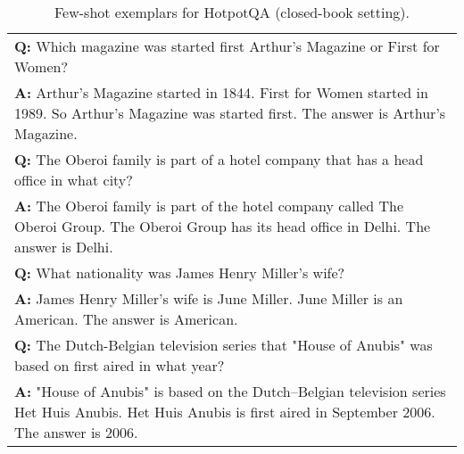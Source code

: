 \begin{table}[h]
    \caption{
    Few-shot exemplars for HotpotQA (closed-book setting).
    }
    \centering
    \small
    \begin{tabular}{p{14cm}}
        \toprule
        \textbf{Q:} Which magazine was started first Arthur's Magazine or First for Women?\\
        \vspace{-1mm}
        \textbf{A:} Arthur's Magazine started in 1844. First for Women started in 1989. So Arthur's Magazine was started first. The answer is Arthur's Magazine.\\
        \vspace{0mm}
        \textbf{Q:} The Oberoi family is part of a hotel company that has a head office in what city?\\
        \vspace{-1mm}
        \textbf{A:} The Oberoi family is part of the hotel company called The Oberoi Group. The Oberoi Group has its head office in Delhi. The answer is Delhi. \\
        \vspace{0mm}
        \textbf{Q:} What nationality was James Henry Miller's wife?\\
        \vspace{-1mm}
        \textbf{A:} James Henry Miller's wife is June Miller. June Miller is an American. The answer is American.\\
        \vspace{0mm}
        \textbf{Q:} The Dutch-Belgian television series that "House of Anubis" was based on first aired in what year?\\
        \vspace{-1mm}
        \textbf{A:} "House of Anubis" is based on the Dutch–Belgian television series Het Huis Anubis. Het Huis Anubis is first aired in September 2006. The answer is 2006.\\
        \bottomrule
    \end{tabular}
    \label{tab:prompt-hotpotqa}
\end{table}

